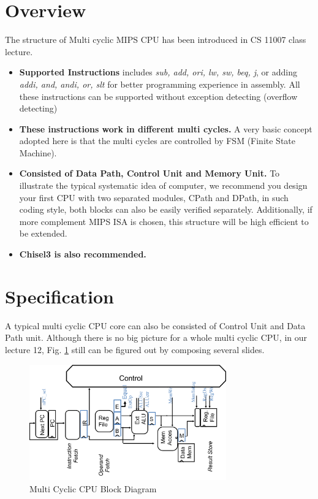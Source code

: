 \documentclass[a4paper]{article}
\begin{document}
\section{Overview} \label{overview}%
The structure of Multi cyclic MIPS CPU has been introduced in CS 11007 class lecture.
\begin{itemize}
	\item{\textbf{Supported Instructions} includes \emph{sub, add, ori, lw, sw, beq, j}, or adding \emph{addi, and, andi, or, slt} for better programming experience in assembly. All these instructions can be supported without exception detecting (overflow detecting)}
    \item{\textbf{These instructions work in different multi cycles.} A very basic concept adopted here is that the multi cycles are controlled by FSM (Finite State Machine).}
    \item{\textbf{Consisted of Data Path, Control Unit and Memory Unit.} To illustrate the typical systematic idea of computer, we recommend you design your first CPU with two separated modules, CPath and DPath, in such coding style, both blocks can also be easily verified separately. Additionally, if more complement MIPS ISA is chosen, this structure will be high efficient to be extended.}
    \item{\textbf{Chisel3 is also recommended.}}
\end{itemize}


\newpage
\section{Specification} \label{Specification}%
A typical multi cyclic CPU core can also be consisted of Control Unit and Data Path unit. Although there is no big picture for a whole multi cyclic CPU, in our lecture 12, Fig. \ref{fig:multiblock} still can be figured out by composing several slides. 
\begin{figure}[ht]
 \centering
 \includegraphics[height=5cm]{images/l2sys.pdf}
 \caption{Multi Cyclic CPU Block Diagram}
 \label{fig:multiblock}
\end{figure}
\end{document}

